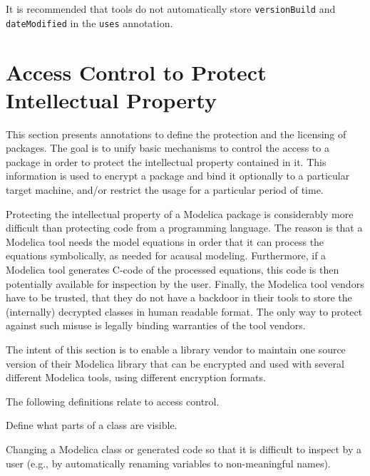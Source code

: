 \begin{nonnormative}
It is recommended that tools do not automatically store \lstinline!versionBuild! and \lstinline!dateModified! in the \lstinline!uses! annotation.
\end{nonnormative}

\section{Access Control to Protect Intellectual Property}\label{annotations-for-access-control-to-protect-intellectual-property}\label{access-control-to-protect-intellectual-property}

This section presents annotations to define the protection and the licensing of packages.
The goal is to unify basic mechanisms to control the access to a package in order to protect the intellectual property contained in it.
This information is used to encrypt a package and bind it optionally to a particular target machine, and/or restrict the usage for a particular period of time.

\begin{nonnormative}
Protecting the intellectual property of a Modelica package is considerably more difficult than protecting code from a programming language.
The reason is that a Modelica tool needs the model equations in order that it can process the equations symbolically, as needed for acausal modeling.
Furthermore, if a Modelica tool generates C-code of the processed equations, this code is then potentially available for inspection by the user.
Finally, the Modelica tool vendors have to be trusted, that they do not have a backdoor in their tools to store the (internally) decrypted classes in human readable format.
The only way to protect against such misuse is legally binding warranties of the tool vendors.

The intent of this section is to enable a library vendor to maintain one source version of their Modelica library that can be encrypted and used with several different Modelica tools, using different encryption formats.
\end{nonnormative}

The following definitions relate to access control.

\begin{definition}[Protection]
Define what parts of a class are visible.
\end{definition}

\begin{definition}[Obfuscation]
Changing a Modelica class or generated code so that it is difficult to inspect by a user (e.g., by automatically renaming variables to non-meaningful names).
\end{definition}

